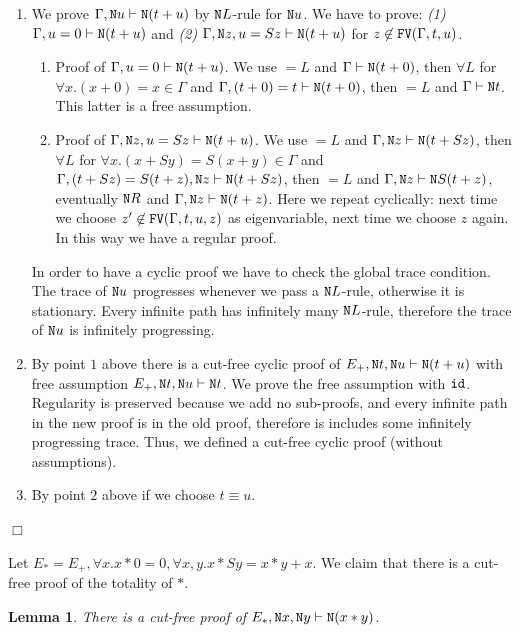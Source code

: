 \documentclass[a4paper,12pt]{article}
\newtheorem{lemma}[theorem]{Lemma}
\newenvironment{proof}[1][Proof]{\begin{trivlist}
\item[\hskip \labelsep {\bfseries #1}]}{\end{trivlist}}
\newcommand{\Nat}               { {\tt N}  }
\newcommand{\FV}              { {\tt FV} }
\newcommand{\id}              { {\tt id} }
\newcommand{\eqL}     {= \! \!  \!  L}
\begin{document}
\begin{proof}
\begin{enumerate}
\item
We prove $\Gamma, \Nat u \vdash \Nat (t+u)$ by $\Nat L$-rule for $\Nat u$. We have to prove: \emph{(1)} $\Gamma, u=0 \vdash \Nat (t+u)$ and \emph{(2)} $\Gamma, \Nat z, u=Sz \vdash \Nat (t+u)$ for $z \not \in \FV(\Gamma, t,u)$. 
\begin{enumerate}
\item
Proof of $\Gamma, u=0 \vdash \Nat (t+u)$. We use $\eqL$ and $\Gamma \vdash \Nat (t+0)$, then $\forall L$ for $\forall x.(x+0)=x \in \Gamma$ and $\Gamma,  (t+0)=t \vdash \Nat (t+0)$, then $\eqL$ and  $\Gamma \vdash \Nat t$. This latter is a free assumption.
\item
Proof of $\Gamma, \Nat z, u=Sz \vdash \Nat (t+u)$. We use $\eqL$ and $\Gamma, \Nat z \vdash \Nat (t+Sz)$, then $\forall L$ for $\forall x.(x+Sy)=S(x+y) \in \Gamma$ and $\Gamma,  (t+Sz)=S(t+z), \Nat z \vdash \Nat (t+Sz)$, then $\eqL$ and  $\Gamma, \Nat z \vdash \Nat S(t+z)$, eventually $\Nat R$ and $\Gamma, \Nat z \vdash \Nat (t+z)$. Here we repeat cyclically: next time we choose $z' \not \in \FV(\Gamma, t,u,z)$ as eigenvariable, next time we choose $z$ again. In this way we have a regular proof.
 \end{enumerate}
In order to have a cyclic proof we have to check the global trace condition. The trace of $\Nat u$ progresses whenever we pass a $\Nat L$-rule, otherwise it is stationary. Every infinite path has infinitely many $\Nat L$-rule, therefore the trace of $\Nat u$ is infinitely progressing. 
\item
By point $1$ above there is a cut-free cyclic proof of $E_+, \Nat t, \Nat u \vdash \Nat (t+u)$ with free assumption $E_+, \Nat t, \Nat u \vdash \Nat t$. We prove the free assumption with $\id$. Regularity is preserved because we add no sub-proofs, and every infinite path in the new proof is in the old proof, therefore is includes some infinitely progressing trace. Thus, we defined a cut-free cyclic proof (without assumptions).
\item
By point $2$ above if we choose $t \equiv u$.
\end{enumerate}
$\Box$ \end{proof}

Let $E_* = E_+, \forall x.x*0=0, \forall x,y.x*Sy=x*y+x$. We claim that there is a cut-free proof of the totality of $*$.

\begin{lemma}
There is a cut-free proof of $E_*, \Nat x, \Nat y \vdash \Nat (x*y)$. 
\end{lemma}
\end{document}
